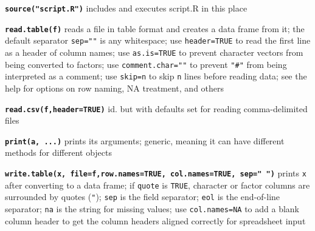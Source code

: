 \documentclass[8pt,landscape]{article}
\newcommand{\code}{\texttt}
\newcommand{\bcode}[1]{\texttt{\textbf{#1}}}
\begin{document}
\begin{multicols*}{3}
\bcode{source("script.R")} includes and executes script.R in this place



\bcode{read.table(f)} reads a file in table format and
                creates a data frame from it; the default separator
                \code{sep=""} is any whitespace; use \code{header=TRUE}
                to read the first line as a header of column names; use \code{as.is=TRUE} to
                prevent character vectors from being converted to
                factors; use \code{comment.char=""} to prevent
                \code{"\#"} from being interpreted as a comment; use
                \code{skip=n} to skip \code{n} lines before reading data; see
                the help for options on row naming, NA treatment, and
                others

\bcode{read.csv(f,header=TRUE)} id. but with defaults set for reading
comma-delimited files









\bcode{print(a, ...)} prints its arguments; generic, meaning it can
have different methods for different objects


\bcode{write.table(x, file=f,row.names=TRUE, col.names=TRUE, sep=" ")} 
prints \code{x} after converting to a data frame; if \code{quote} is
                 \code{TRUE}, character or factor columns are
                 surrounded by quotes (\code{"}); \code{sep} is the field
                 separator; \code{eol} is the end-of-line separator;
                 \code{na} is the string for missing values; use
                 \code{col.names=NA} to add a blank column header to
                 get the column headers aligned correctly for
                 spreadsheet input


\end{multicols*}
\end{document}
